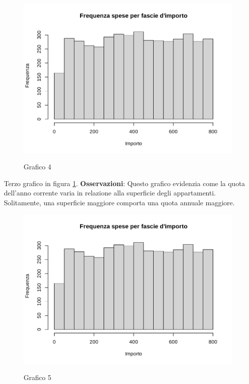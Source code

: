 \clearpage

\begin{figure}[t]
	\caption{Grafico 4}
	\includegraphics[page=4,width=\textwidth]{../R/grafici.pdf}
	\label{fig3}
\end{figure}

Terzo grafico in figura \ref{fig3}. \textbf{Osservazioni}: Questo grafico evidenzia come la quota dell'anno corrente varia in relazione alla superficie degli appartamenti. Solitamente, una superficie maggiore comporta una quota annuale maggiore.

\clearpage

\begin{figure}[t]
	\caption{Grafico 5}
	\includegraphics[page=5,width=\textwidth]{../R/grafici.pdf}
	\label{fig5}
\end{figure}


